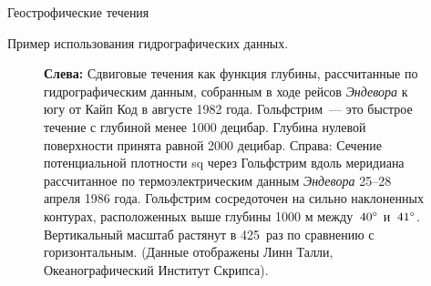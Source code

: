 \begin{chapter}{Геострофические течения}
\begin{section}{Пример использования гидрографических данных.}
\begin{figure}[t!]
\caption{\textbf{Слева:} Сдвиговые течения как функция глубины,
рассчитанные по гидрографическим данным, собранным в ходе рейсов
\emph{Эндевора} к югу от Кайп Код в августе 1982 года. Гольфстрим~---
это быстрое течение с глубиной менее 1000 децибар. Глубина нулевой
поверхности принята равной 2000 децибар. Справа: Сечение потенциальной
плотности sq через Гольфстрим вдоль меридиана 
рассчитанное по термоэлектрическим данным \emph{Эндевора} 25--28
апреля 1986 года. Гольфстрим сосредоточен на сильно наклоненных
контурах, расположенных выше глубины 1000 м между~${40}^\circ$
и~${41}^\circ$. Вертикальный масштаб растянут в 425~раз по сравнению
с горизонтальным. (Данные отображены Линн Талли, Океанографический
Институт Скрипса).}
\label{profileandsection}
\end{figure}
%

\end{section}
\end{chapter}
